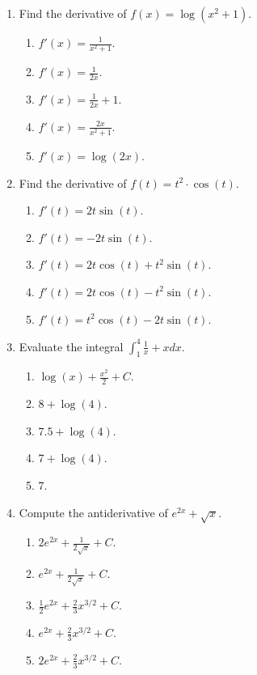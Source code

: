 \documentclass{article}
\begin{document}
\begin{enumerate}


  \item Find the derivative of $f(x)=\log(x^2+1).$
  \begin{enumerate}
    \item $f'(x)=\frac{1}{x^2+1}$.
    \item $f'(x)=\frac{1}{2x}$.
    \item $f'(x)=\frac{1}{2x}+1$.
    \item $f'(x)=\frac{2x}{x^2+1}$.  %
    \item $f'(x)=\log(2x)$.
  \end{enumerate}

  \item Find the derivative of $f(t)=t^2\cdot \cos(t).$
  \begin{enumerate}
    \item $f'(t)=2t\sin(t)$.
    \item $f'(t)=-2t\sin(t)$.
    \item $f'(t)=2t\cos(t)+t^2\sin(t)$.
    \item $f'(t)=2t\cos(t)-t^2\sin(t)$.  %
    \item $f'(t)=t^2\cos(t)-2t\sin(t)$.
  \end{enumerate}
  
  \item Evaluate the integral  $\int_{1}^4\frac{1}{x}+xdx.$
  \begin{enumerate}
    \item $\log(x)+\frac{x^2}{2}+C$.
    \item $8+\log(4)$.  
    \item $7.5+\log(4)$. %
    \item $7+\log(4)$. 
    \item $7$.
  \end{enumerate}
  
  \item Compute the  antiderivative of $e^{2x}+\sqrt{x}$.
  \begin{enumerate}
    \item $2e^{2x}+\frac{1}{2\sqrt{x}}+C$.
    \item $e^{2x}+\frac{1}{2\sqrt{x}}+C$.
    \item $\frac{1}{2}e^{2x}+\frac{2}{3}x^{3/2}+C$. %
    \item $e^{2x}+\frac{2}{3}x^{3/2}+C$. 
    \item $2e^{2x}+\frac{2}{3}x^{3/2}+C$.
  \end{enumerate}
  

\end{enumerate}
\end{document}
